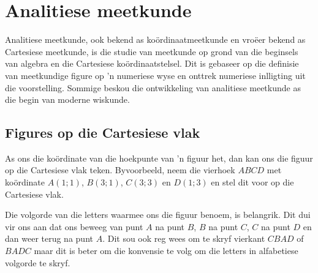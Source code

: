 \chapter{Analitiese meetkunde}
Analitiese meetkunde, ook bekend as koördinaatmeetkunde en vroëer bekend as Cartesiese meetkunde, is die studie van meetkunde op grond van die beginsels van algebra en die Cartesiese koördinaatstelsel. Dit is gebaseer op die definisie van meetkundige figure op ’n numeriese wyse en onttrek numeriese inlligting uit die voorstelling. Sommige beskou die ontwikkeling van analitiese meetkunde as die begin van moderne wiskunde.

\par 
{}
\section{Figures op die Cartesiese vlak}
As ons die koördinate van die hoekpunte van ’n figuur het, dan kan ons die figuur op die Cartesiese vlak teken.
Byvoorbeeld, neem die vierhoek $ABCD$ met koördinate $A(1;1)$, $B(3;1)$, $C(3;3)$ en $D(1;3)$ en stel dit voor op die Cartesiese vlak. \par 

\setcounter{subfigure}{0}
\begin{figure}[H] %
\begin{center}
\end{center}
\label{fig:cartesianplane}
\end{figure} 

Die volgorde van die letters waarmee ons die figuur benoem, is belangrik. Dit dui vir ons aan dat ons beweeg van punt $A$ na punt $B$, $B$ na punt $C$, $C$ na punt $D$ en dan weer terug na punt  $A$. Dit sou ook reg wees om te skryf vierkant $CBAD$ of $BADC$ maar dit is beter om die konvensie te volg om die letters in alfabetiese volgorde te skryf.     

